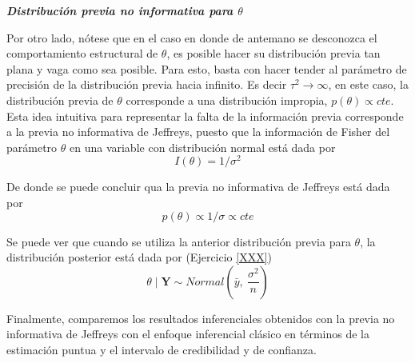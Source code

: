\documentclass[10pt,openright]{book}\usepackage[]{graphicx}\usepackage[]{color}
\begin{document}
    \textbf{\emph{Distribuci\'on previa no informativa para $\theta$}}
    
    Por otro lado, n\'otese que en el caso en donde de antemano se desconozca el comportamiento estructural de $\theta$, es posible hacer su distribuci\'on previa tan plana y vaga como sea posible. Para esto, basta con hacer tender al par\'ametro de precisi\'on de la distribuci\'on previa hacia infinito. Es decir $\tau^2 \longrightarrow \infty$, en este caso, la distribuci\'on previa de $\theta$ corresponde a una distribuci\'on impropia, $p(\theta)\propto cte$. Esta idea intuitiva para representar la falta de la informaci\'on previa corresponde a la previa no informativa de Jeffreys, puesto que la informaci\'on de Fisher del par\'ametro $\theta$ en una variable con distribuci\'on normal est\'a dada por 
    \begin{equation*}
    I(\theta)=1/\sigma^2
    \end{equation*}
    
    De donde se puede concluir qua la previa no informativa de Jeffreys est\'a dada por 
    \begin{equation*}
    p(\theta)\propto 1/\sigma\propto cte
    \end{equation*}
    
    Se puede ver que cuando se utiliza la anterior distribuci\'on previa para $\theta$, la distribuci\'on posterior est\'a dada por (Ejercicio \ref{XXX})
    \begin{equation*}
    \theta\mid\mathbf{Y}\sim Normal\left(\bar{y},\ \dfrac{\sigma^2}{n}\right)
    \end{equation*}
    
    Finalmente, comparemos los resultados inferenciales obtenidos con la previa no informativa de Jeffreys con el enfoque inferencial cl\'asico en t\'erminos de la estimaci\'on puntua y el intervalo de credibilidad y de confianza.
    
\end{document}
